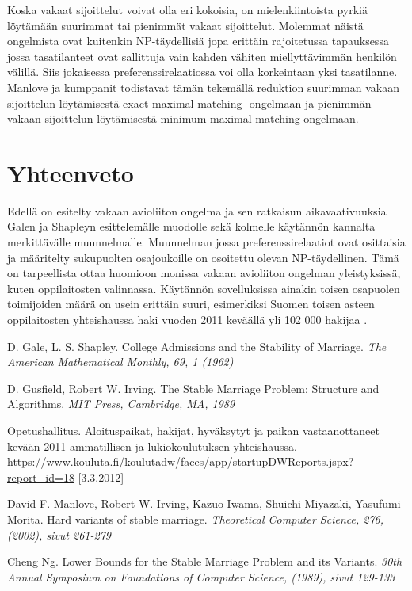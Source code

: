\documentclass[gradu, twoside]{tktltiki}
\begin{document}
Koska vakaat sijoittelut voivat olla eri kokoisia, on mielenkiintoista
pyrkiä löytämään suurimmat tai pienimmät vakaat sijoittelut. Molemmat
näistä ongelmista ovat kuitenkin NP-täydellisiä jopa erittäin
rajoitetussa tapauksessa jossa tasatilanteet ovat sallittuja vain
kahden vähiten miellyttävimmän henkilön välillä. Siis jokaisessa
preferenssirelaatiossa voi olla korkeintaan yksi tasatilanne. Manlove
ja kumppanit todistavat tämän tekemällä reduktion suurimman vakaan
sijoittelun löytämisestä exact maximal matching -ongelmaan ja
pienimmän vakaan sijoittelun löytämisestä minimum maximal matching
ongelmaan. \cite{manlove02}

\section{Yhteenveto}

Edellä on esitelty vakaan avioliiton ongelma ja sen ratkaisun
aikavaativuuksia Galen ja Shapleyn esittelemälle muodolle sekä
kolmelle käytännön kannalta merkittävälle muunnelmalle. Muunnelman
jossa preferenssirelaatiot ovat osittaisia ja määritelty sukupuolten
osajoukoille on osoitettu olevan NP-täydellinen. Tämä on tarpeellista
ottaa huomioon monissa vakaan avioliiton ongelman yleistyksissä, kuten
oppilaitosten valinnassa. Käytännön sovelluksissa ainakin toisen
osapuolen toimijoiden määrä on usein erittäin suuri, esimerkiksi
Suomen toisen asteen oppilaitosten yhteishaussa haki vuoden 2011
keväällä yli 102 000 hakijaa \cite{OPH12}.

\begin{thebibliography}{XXX99}

  D. Gale, L. S. Shapley.
  College Admissions and the Stability of Marriage.
  \emph{The American Mathematical Monthly, 69, 1 (1962)}

  D. Gusfield, Robert W. Irving.
  The Stable Marriage Problem: Structure and Algorithms.
  \emph{MIT Press, Cambridge, MA, 1989}

  Opetushallitus.
  Aloituspaikat, hakijat, hyväksytyt ja paikan vastaanottaneet
  kevään 2011 ammatillisen ja lukiokoulutuksen yhteishaussa.
  \url{https://www.kouluta.fi/koulutadw/faces/app/startupDWReports.jspx?report_id=18}
      [3.3.2012]

  David F. Manlove, Robert W. Irving, Kazuo Iwama, Shuichi Miyazaki,
  Yasufumi Morita.
  Hard variants of stable marriage.
  \emph{Theoretical Computer Science, 276, (2002), sivut 261-279}

  Cheng Ng.
  Lower Bounds for the Stable Marriage Problem and its Variants.
  \emph{30th Annual Symposium on Foundations of Computer Science,
    (1989), sivut 129-133}

\end{thebibliography}
\end{document}
